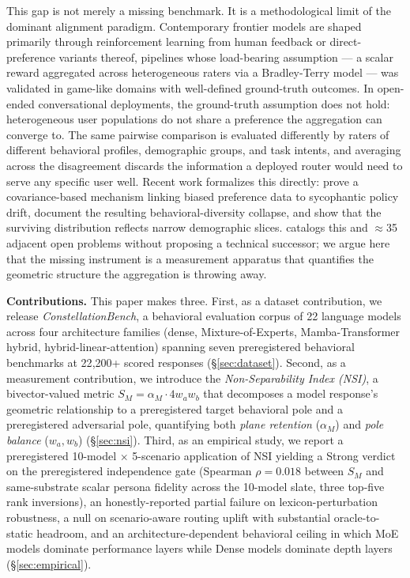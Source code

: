 \documentclass{article}
\begin{document}
This gap is not merely a missing benchmark. It is a methodological limit of the dominant alignment paradigm. Contemporary frontier models are shaped primarily through reinforcement learning from human feedback \citep{christiano2017deep, ouyang2022training, bai2022constitutional} or direct-preference variants thereof, pipelines whose load-bearing assumption --- a scalar reward aggregated across heterogeneous raters via a Bradley-Terry model --- was validated in game-like domains with well-defined ground-truth outcomes. In open-ended conversational deployments, the ground-truth assumption does not hold: heterogeneous user populations do not share a preference the aggregation can converge to. The same pairwise comparison is evaluated differently by raters of different behavioral profiles, demographic groups, and task intents, and averaging across the disagreement discards the information a deployed router would need to serve any specific user well. Recent work formalizes this directly: \citet{shapira2026rlhf} prove a covariance-based mechanism linking biased preference data to sycophantic policy drift, \citet{kirk2024understanding} document the resulting behavioral-diversity collapse, and \citet{santurkar2023whose} show that the surviving distribution reflects narrow demographic slices. \citet{casper2023open} catalogs this and $\approx$35 adjacent open problems without proposing a technical successor; we argue here that the missing instrument is a measurement apparatus that quantifies the geometric structure the aggregation is throwing away.

\textbf{Contributions.} This paper makes three. First, as a dataset contribution, we release \emph{ConstellationBench}, a behavioral evaluation corpus of 22 language models across four architecture families (dense, Mixture-of-Experts, Mamba-Transformer hybrid, hybrid-linear-attention) spanning seven preregistered behavioral benchmarks at 22{,}200+ scored responses (\S\ref{sec:dataset}). Second, as a measurement contribution, we introduce the \emph{Non-Separability Index (NSI)}, a bivector-valued metric $S_M = \alpha_M \cdot 4 w_a w_b$ that decomposes a model response's geometric relationship to a preregistered target behavioral pole and a preregistered adversarial pole, quantifying both \emph{plane retention} ($\alpha_M$) and \emph{pole balance} ($w_a, w_b$) (\S\ref{sec:nsi}). Third, as an empirical study, we report a preregistered 10-model $\times$ 5-scenario application of NSI yielding a Strong verdict on the preregistered independence gate (Spearman $\rho = 0.018$ between $S_M$ and same-substrate scalar persona fidelity across the 10-model slate, three top-five rank inversions), an honestly-reported partial failure on lexicon-perturbation robustness, a null on scenario-aware routing uplift with substantial oracle-to-static headroom, and an architecture-dependent behavioral ceiling in which MoE models dominate performance layers while Dense models dominate depth layers (\S\ref{sec:empirical}).
\end{document}

